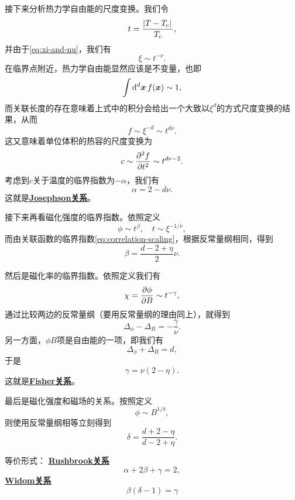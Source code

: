 \documentclass[hyperref, UTF8, a4paper]{ctexart}
\newcommand*{\concept}[1]{\underline{\textbf{#1}}}
\begin{document}
接下来分析热力学自由能的尺度变换。我们令
\begin{equation}
    t = \frac{\abs*{T-T_\text{c}}}{T_\text{c}},
\end{equation}
并由于\eqref{eq:xi-and-nu}，我们有
\begin{equation}
    \xi \sim t^{-\nu}.
\end{equation}
在临界点附近，热力学自由能显然应该是不变量，也即
\[
    \int \dd[d]{\vb*{x}} f(\vb*{x}) \sim 1,
\]
而关联长度的存在意味着上式中的积分会给出一个大致以$\xi^d$的方式尺度变换的结果，从而
\begin{equation}
    f \sim \xi^{-d} \sim t^{d\nu}.
\end{equation}
这又意味着单位体积的热容的尺度变换为
\[
    c \sim \pdv[2]{f}{t} \sim t^{d\nu-2}.
\]
考虑到$c$关于温度的临界指数为$-\alpha$，我们有
\begin{equation}
    \alpha = 2 - d \nu.
    \label{eq:josephson-relation}
\end{equation}
这就是\concept{Josephson关系}。

接下来再看磁化强度的临界指数。依照定义
\[
    \phi \sim t^\beta, \quad t \sim \xi^{-1/\nu},
\]
而由关联函数的临界指数\eqref{eq:correlation-scaling}，根据反常量纲相同，得到
\begin{equation}
    \beta = \frac{d-2+\eta}{2}\nu.
\end{equation}

然后是磁化率的临界指数。依照定义我们有
\[
    \chi = \pdv{\phi}{B} \sim t^{-\gamma},
\]
通过比较两边的反常量纲（要用反常量纲的理由同上），就得到
\[
    \Delta_\phi - \Delta_B = - \frac{\gamma}{\nu}.
\]
另一方面，$\phi B$项是自由能的一项，即我们有
\[
    \Delta_\phi + \Delta_B = d,
\]
于是
\begin{equation}
    \gamma = \nu (2 - \eta).   
\end{equation}
这就是\concept{Fisher关系}。

最后是磁化强度和磁场的关系。按照定义
\[
    \phi \sim B^{1/\delta},
\]
则使用反常量纲相等立刻得到
\begin{equation}
    \delta = \frac{d+2-\eta}{d-2+\eta}.
\end{equation}

等价形式：
\concept{Rushbrook关系}
\begin{equation}
    \alpha + 2 \beta + \gamma = 2,
\end{equation}
\concept{Widom关系}
\begin{equation}
    \beta(\delta - 1) = \gamma
\end{equation}
\end{document}
